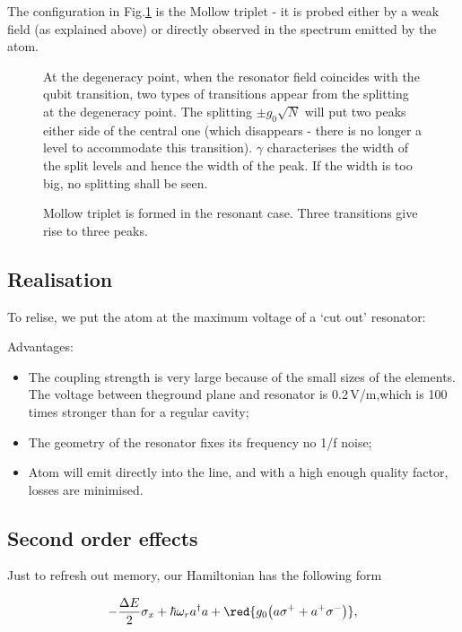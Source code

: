 The  configuration  in  Fig.\ref{qrDegen2}  is  the  Mollow
triplet - it is probed either by a weak field (as explained
above) or directly observed in  the spectrum emitted by the
atom.


\begin{figure}
  \caption{At  the  degeneracy  point, when  the  resonator
    field coincides with the qubit transition, two types of
    transitions appear from the splitting at the degeneracy
    point. The splitting  $ \pm g_0\sqrt{N} $  will put two
    peaks either side of  the central one (which disappears
    -  there  is no  longer  a  level to  accommodate  this
    transition).   $ \gamma  $  characterises the  width of  the
    split levels and  hence the width of the  peak.  If the
    width   is    too   big,   no   splitting    shall   be
    seen.\label{qrDegen2}}
\end{figure}

\begin{figure}
  \caption{Mollow triplet  is formed in the  resonant case.
    Three     transitions     give    rise     to     three
    peaks.\label{qrMollow}}
\end{figure}
\newpage
\subsection{Realisation}
To relise, we put the atom at the maximum voltage of a `cut
out' resonator:

 Advantages:
\begin{itemize}
\item The  coupling strength is  very large because  of the
  small  sizes  of  the   elements.   The  voltage  between
  theground plane  and resonator  is 0.2\,V/m,which  is 100
  times stronger than for a regular cavity;
\item The geometry of the resonator fixes its frequency \ra
  no 1/f noise;
\item Atom  will emit  directly into the  line, and  with a
  high enough quality factor, losses are minimised.
\end{itemize}

\subsection{Second order effects}
Just  to  refresh  out  memory,  our  Hamiltonian  has  the
following form

\begin{equation}\label{sec}
  -\frac{\Delta E}{2}\sigma_x + \hbar\omega_ra^{\dagger}a + \red{g_0\big(a\sigma^{+}+a^{+}\sigma^{-}\big)},
\end{equation}

